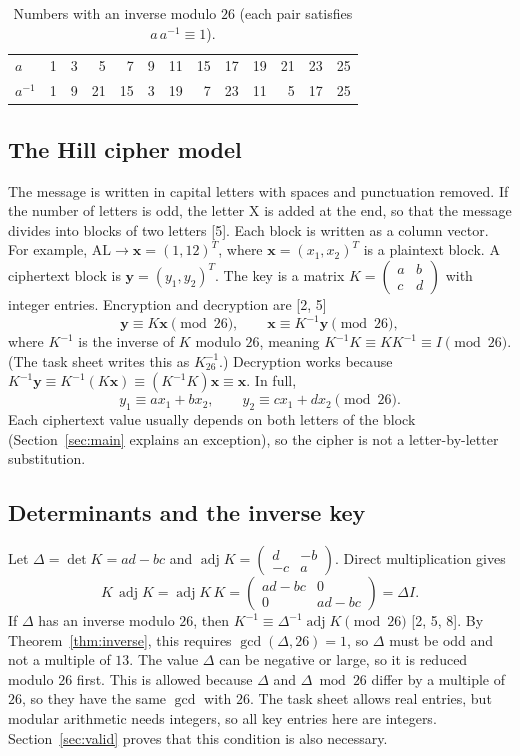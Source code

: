\documentclass[11pt,a4paper]{article}
\newcommand{\vect}[1]{\begin{pmatrix}#1\end{pmatrix}}
\newcommand{\smat}[1]{\left(\begin{smallmatrix}#1\end{smallmatrix}\right)}
\newcommand{\x}{\mathbf{x}}   %
\newcommand{\y}{\mathbf{y}}   %
\newcommand{\adj}{\operatorname{adj}}
\theoremstyle{plain}
\theoremstyle{definition}
\begin{document}
\begin{table}[ht]
\centering
\small
\caption{Numbers with an inverse modulo $26$ (each pair satisfies $a\,a^{-1}\equiv1$).}
\label{tab:inverses}
\setlength{\tabcolsep}{5pt}
\begin{tabular}{l *{12}{r}}
\toprule
$a$ & 1 & 3 & 5 & 7 & 9 & 11 & 15 & 17 & 19 & 21 & 23 & 25\\
$a^{-1}$ & 1 & 9 & 21 & 15 & 3 & 19 & 7 & 23 & 11 & 5 & 17 & 25\\
\bottomrule
\end{tabular}
\end{table}

\subsection{The Hill cipher model}

The message is written in capital letters with spaces and punctuation removed. If the number of letters is odd, the letter X is added at the end, so that the message divides into blocks of two letters [5]. Each block is written as a column vector. For example, $\text{AL}\longrightarrow\x=(1,12)^T$, where $\x=(x_1,x_2)^T$ is a plaintext block. A ciphertext block is $\y=(y_1,y_2)^T$. The key is a matrix $K=\smat{a&b\\c&d}$ with integer entries. Encryption and decryption are [2, 5]
\[
\y\equiv K\x\pmod{26},
\qquad
\x\equiv K^{-1}\y\pmod{26},
\]
where $K^{-1}$ is the inverse of $K$ modulo $26$, meaning $K^{-1}K\equiv KK^{-1}\equiv I\pmod{26}$. (The task sheet writes this as $K^{-1}_{26}$.) Decryption works because $K^{-1}\y\equiv K^{-1}(K\x)\equiv(K^{-1}K)\x\equiv\x$. In full,
\[
y_1\equiv ax_1+bx_2,\qquad y_2\equiv cx_1+dx_2\pmod{26}.
\]
Each ciphertext value usually depends on both letters of the block (Section~\ref{sec:main} explains an exception), so the cipher is not a letter-by-letter substitution.

\subsection{Determinants and the inverse key}

Let $\Delta=\det K=ad-bc$ and $\adj K=\smat{d&-b\\-c&a}$. Direct multiplication gives
\[
K\,\adj K=\adj K\,K=\vect{ad-bc&0\\0&ad-bc}=\Delta I.
\]
If $\Delta$ has an inverse modulo $26$, then $K^{-1}\equiv\Delta^{-1}\adj K\pmod{26}$ [2, 5, 8]. By Theorem~\ref{thm:inverse}, this requires $\gcd(\Delta,26)=1$, so $\Delta$ must be odd and not a multiple of $13$. The value $\Delta$ can be negative or large, so it is reduced modulo $26$ first. This is allowed because $\Delta$ and $\Delta\bmod 26$ differ by a multiple of $26$, so they have the same $\gcd$ with $26$. The task sheet allows real entries, but modular arithmetic needs integers, so all key entries here are integers. Section~\ref{sec:valid} proves that this condition is also necessary.
\end{document}
